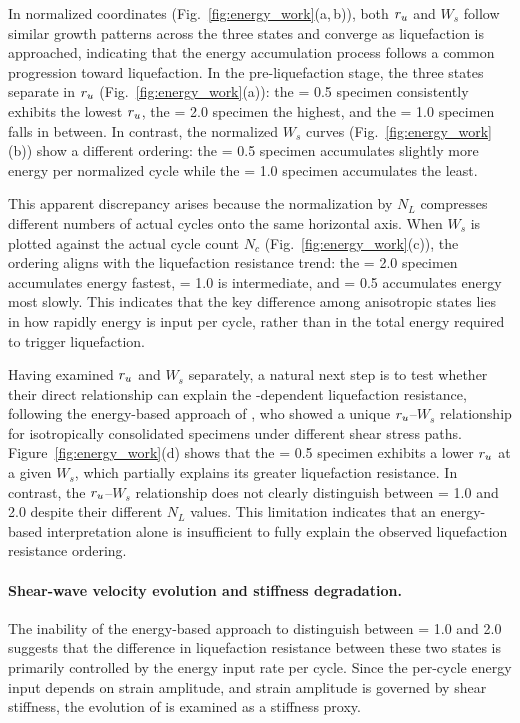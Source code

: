In normalized coordinates (Fig.~\ref{fig:energy_work}(a,\,b)), both $r_u$ and $W_s$ follow similar growth patterns across the three \Kzero{} states and converge as liquefaction is approached, indicating that the energy accumulation process follows a common progression toward liquefaction. In the pre-liquefaction stage, the three states separate in $r_u$ (Fig.~\ref{fig:energy_work}(a)): the \Kzero{} = 0.5 specimen consistently exhibits the lowest $r_u$, the \Kzero{} = 2.0 specimen the highest, and the \Kzero{} = 1.0 specimen falls in between. In contrast, the normalized $W_s$ curves (Fig.~\ref{fig:energy_work}(b)) show a different ordering: the \Kzero{} = 0.5 specimen accumulates slightly more energy per normalized cycle while the \Kzero{} = 1.0 specimen accumulates the least.

This apparent discrepancy arises because the normalization by $N_L$ compresses different numbers of actual cycles onto the same horizontal axis. When $W_s$ is plotted against the actual cycle count $N_c$ (Fig.~\ref{fig:energy_work}(c)), the ordering aligns with the liquefaction resistance trend: the \Kzero{} = 2.0 specimen accumulates energy fastest, \Kzero{} = 1.0 is intermediate, and \Kzero{} = 0.5 accumulates energy most slowly. This indicates that the key difference among anisotropic states lies in how rapidly energy is input per cycle, rather than in the total energy required to trigger liquefaction.

Having examined $r_u$ and $W_s$ separately, a natural next step is to test whether their direct relationship can explain the \Kzero{}-dependent liquefaction resistance, following the energy-based approach of \citet{TowhataIshihara1985}, who showed a unique $r_u$--$W_s$ relationship for isotropically consolidated specimens under different shear stress paths. Figure~\ref{fig:energy_work}(d) shows that the \Kzero{} = 0.5 specimen exhibits a lower $r_u$ at a given $W_s$, which partially explains its greater liquefaction resistance. In contrast, the $r_u$--$W_s$ relationship does not clearly distinguish between \Kzero{} = 1.0 and 2.0 despite their different $N_L$ values. This limitation indicates that an energy-based interpretation alone is insufficient to fully explain the observed liquefaction resistance ordering.

\paragraph{Shear-wave velocity evolution and stiffness degradation.}
The inability of the energy-based approach to distinguish between \Kzero{} = 1.0 and 2.0 suggests that the difference in liquefaction resistance between these two states is primarily controlled by the energy input rate per cycle. Since the per-cycle energy input depends on strain amplitude, and strain amplitude is governed by shear stiffness, the evolution of \Vs{} is examined as a stiffness proxy.

